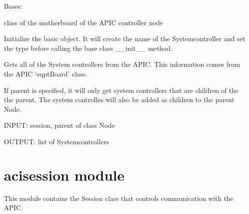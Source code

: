 \documentclass[letterpaper,10pt,english]{sphinxmanual}
\begin{document}
\begin{fulllineitems}
\label{aciphysobject:aciphysobject.Systemcontroller}
Bases: {\hyperref[aciphysobject:aciphysobject.BaseACIPhysModule]{}}

class of the motherboard of the APIC controller node

Initialize the basic object.  It will create the name of the Systemcontroller and set the type
before calling the base class \_\_init\_\_ method.

\begin{fulllineitems}
\label{aciphysobject:aciphysobject.Systemcontroller.get}
Gets all of the System controllers from the APIC. This information comes from
the APIC `eqptBoard' class.

If parent is specified, it will only get system controllers that are
children of the the parent.  The system controlles will also be added as children to the parent Node.

INPUT: session, parent of class Node

OUTPUT: list of Systemcontrollers

\end{fulllineitems}


\end{fulllineitems}



\section{acisession module}
\label{acisession:acisession-module}\label{acisession::doc}\label{acisession:module-acisession}
This module contains the Session class that controls communication
with the APIC.
\end{document}
